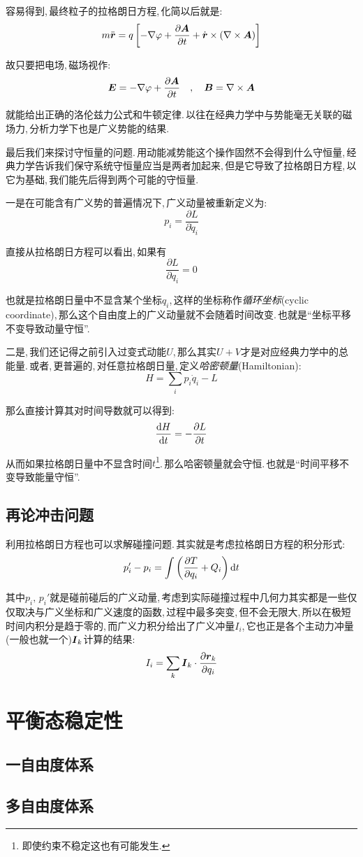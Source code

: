 容易得到,\,最终粒子的拉格朗日方程,\,化简以后就是:
\[m\ddot{\boldsymbol{r}}=q\left[-\nabla\varphi+\frac{\partial \boldsymbol{A}}{\partial t}+\dot{\boldsymbol{r}}\times(\nabla\times\boldsymbol{A})\right]\]

故只要把电场,\,磁场视作:
\[\boldsymbol{E}=-\nabla\varphi+\frac{\partial \boldsymbol{A}}{\partial t}\quad,\quad \boldsymbol{B}=\nabla\times\boldsymbol{A}\]

就能给出正确的洛伦兹力公式和牛顿定律.\,以往在经典力学中与势能毫无关联的磁场力,\,分析力学下也是广义势能的结果.

\vspace{1cm}
最后我们来探讨守恒量的问题.\,用动能减势能这个操作固然不会得到什么守恒量,\,经典力学告诉我们保守系统守恒量应当是两者加起来,\,但是它导致了拉格朗日方程,\,以它为基础,\,我们能先后得到两个可能的守恒量.

一是在可能含有广义势的普遍情况下,\,广义动量被重新定义为:
\[p_i=\frac{\partial L}{\partial \dot{q}_i}\]

直接从拉格朗日方程可以看出,\,如果有
\[\frac{\partial L}{\partial {q}_i}=0\]

也就是拉格朗日量中不显含某个坐标$q_i$,\,这样的坐标称作\emph{循环坐标}(cyclic coordinate),\,那么这个自由度上的广义动量就不会随着时间改变.\,也就是``坐标平移不变导致动量守恒''.

二是,\,我们还记得之前引入过变式动能$U$,\,那么其实$U+V$才是对应经典力学中的总能量.\,或者,\,更普遍的,\,对任意拉格朗日量,\,定义\emph{哈密顿量}(Hamiltonian):
\[H=\sum_i p_i\dot{q}_i-L\]

那么直接计算其对时间导数就可以得到:
\[\frac{\textrm{d} H}{\textrm{d} t}=-\frac{\partial L}{\partial t}\]

从而如果拉格朗日量中不显含时间$t$\footnote{即使约束不稳定这也有可能发生.}.\,那么哈密顿量就会守恒.\,也就是``时间平移不变导致能量守恒''.


\subsection{再论冲击问题}

利用拉格朗日方程也可以求解碰撞问题.\,其实就是考虑拉格朗日方程的积分形式:
\[p_i'-p_i=\int \left(\frac{\partial T}{\partial q_i}+Q_i\right)\textrm{d} t\]

其中$p_i,\,p_i'$就是碰前碰后的广义动量,\,考虑到实际碰撞过程中几何力其实都是一些仅仅取决与广义坐标和广义速度的函数,\,过程中最多突变,\,但不会无限大,\,所以在极短时间内积分是趋于零的,\,而广义力积分给出了广义冲量$I_i$,\,它也正是各个主动力冲量(一般也就一个)$\boldsymbol{I}_k$计算的结果:
\[I_i=\sum_k \boldsymbol{I}_k\cdot \frac{\partial \boldsymbol{r}_k}{\partial q_i}\]


\section{平衡态稳定性}

\subsection{一自由度体系}



\subsection{多自由度体系}



